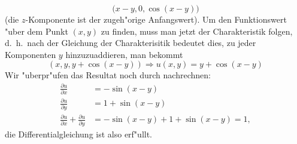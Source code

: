 {\begin{loesung}
\[
\biggl(x-y, 0,\cos (x-y)\biggr)
\]
(die $z$-Komponente ist der zugeh"orige Anfangswert). Um den Funktionswert
"uber dem Punkt $(x,y)$ zu finden, muss man jetzt der Charakteristik folgen,
d.~h.~nach der Gleichung der Charakterisitik bedeutet dies, zu jeder
Komponenten $y$ hinzuzuaddieren, man bekommt
\[
(x, y,y+\cos (x-y)) 
\Rightarrow u(x,y)=y+\cos(x-y)
\]
Wir "uberpr"ufen das Resultat noch durch nachrechnen:
\begin{align*}
\frac{\partial u}{\partial x}
&=
-\sin(x-y)
\\
\frac{\partial u}{\partial y}
&=
1+\sin(x-y)
\\
\frac{\partial u}{\partial x}
+
\frac{\partial u}{\partial y}
&=
-\sin(x-y)
+
1+\sin(x-y)
=1,
\end{align*}
die Differentialgleichung ist also erf"ullt.
\end{loesung}
}{}

